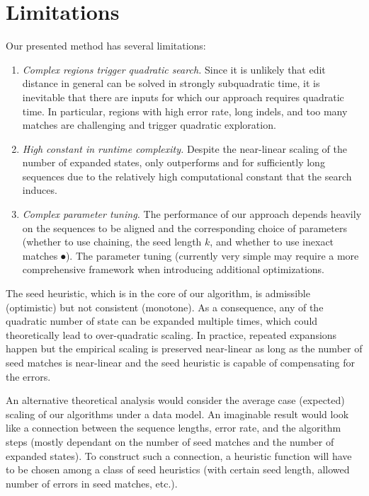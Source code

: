 \section*{Limitations}

Our presented method has several limitations:
\begin{enumerate}
  \item \emph{Complex regions trigger quadratic search.} Since it is unlikely
        that edit distance in general can be solved in strongly subquadratic
        time, it is inevitable that there are inputs for which our approach
        requires quadratic time.  In particular, regions with high error rate,
        long indels, and too many matches are challenging and trigger quadratic
        exploration.
  \item \emph{High constant in runtime complexity.} Despite the near-linear
        scaling of the number of expanded states, \astarpa only outperforms
        \edlib and \wfa for sufficiently long sequences due to the relatively
        high computational constant that the \A search induces.
  \item \emph{Complex parameter tuning.} The performance of our approach depends
        heavily on the sequences to be aligned and the corresponding choice of
        parameters (whether to use chaining, the seed length $k$, and whether to
        use inexact matches $\spot$). The parameter tuning (currently very
        simple may require a more comprehensive framework when introducing
        additional optimizations.
\end{enumerate}

The seed heuristic, which is in the core of our \A algorithm, is admissible
(optimistic) but not consistent (monotone). As a consequence, any of the
quadratic number of state can be expanded multiple times, which could
theoretically lead to over-quadratic scaling. In practice, repeated expansions
happen but the empirical scaling is preserved near-linear as long as the number
of seed matches is near-linear and the seed heuristic is capable of compensating
for the errors.

An alternative theoretical analysis would consider the average case (expected)
scaling of our algorithms under a data model. An imaginable result would look
like a connection between the sequence lengths, error rate, and the algorithm
steps (mostly dependant on the number of seed matches and the number of expanded
states). To construct such a connection, a heuristic function will have to be
chosen among a class of seed heuristics (with certain seed length, allowed
number of errors in seed matches, etc.).
